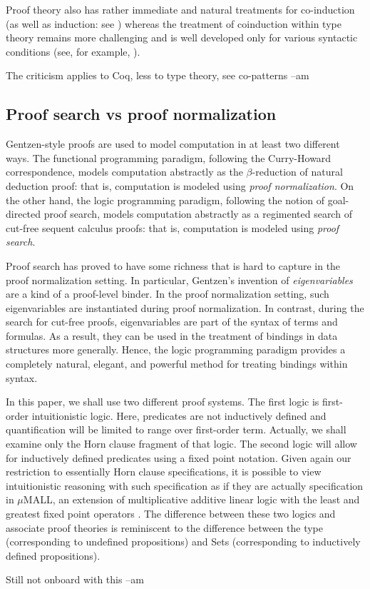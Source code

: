 Proof theory also has rather immediate and natural treatments for
co-induction (as well as induction: see
\cite{baelde12tocl,momigliano12jal}) whereas the treatment of
coinduction within type theory remains more challenging and is well
developed only for various syntactic conditions (see, for example,
\cite{bertot08entcs}).
\begin{metanote}
  The criticism applies to Coq, less to type theory, see co-patterns --am
\end{metanote}

\subsection{Proof search vs proof normalization}

Gentzen-style proofs are used to model computation in at least two
different ways.  The functional programming paradigm, following the
Curry-Howard correspondence, models computation abstractly as the
$\beta$-reduction of natural deduction proof: that is, computation is
modeled using \emph{proof normalization}.  On the other hand, the
logic programming paradigm, following the notion of goal-directed
proof search, models computation abstractly as a regimented search of
cut-free sequent calculus proofs: that is, computation is modeled
using \emph{proof search}.

Proof search has proved to have some richness that is hard to capture
in the proof normalization setting.  In particular, Gentzen's
invention of \emph{eigenvariables} are a kind of a proof-level
binder.  In the proof normalization setting, such eigenvariables
are instantiated during proof normalization.  In contrast, during the
search for cut-free proofs, eigenvariables are part of the syntax of
terms and formulas.  As a result, they can be used in the treatment of
bindings in data structures more generally.  Hence, the logic
programming paradigm provides a completely natural, elegant, and
powerful method for treating bindings
within syntax.

In this paper, we shall use two different proof systems.  The first
logic is first-order intuitionistic logic.  Here, predicates
are not inductively defined and quantification will be limited to
range over first-order term.  Actually, we shall examine only the Horn
clause fragment of that logic.
%
The second logic will allow for inductively defined predicates using a
fixed point notation.   Given again our restriction to essentially
Horn clause specifications, it is possible to view intuitionistic
reasoning with such specification as if they are actually
specification in $\mu$MALL, an extension of multiplicative additive
linear logic with the least and greatest fixed point operators
\cite{baelde12tocl,baelde07lpar,heath19jar}.
%
The difference between these two logics and associate proof theories
is reminiscent to the difference between the type 
(corresponding to undefined propositions) and Sets (corresponding to
inductively defined propositions).
\begin{metanote}
  Still not onboard with this --am
\end{metanote}


